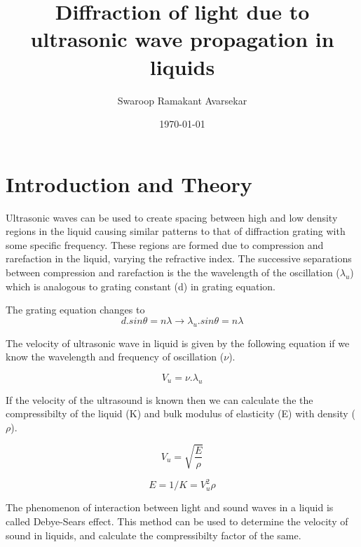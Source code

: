\documentclass[a4paper, amsfonts, amssymb, amsmath, reprint, showkeys, nofootinbib, twoside]{revtex4-1}
\begin{document}
\title{Diffraction of light due to ultrasonic wave propagation in liquids}
\author{Swaroop Ramakant Avarsekar}
\date{\today}
	
\maketitle

\section{Introduction and Theory}
Ultrasonic waves can be used to create spacing between high and low density regions in the liquid causing similar patterns to that of diffraction grating with some specific frequency. These regions are formed due to compression and rarefaction in the liquid, varying the refractive index. The successive separations between compression and rarefaction is the the wavelength of the oscillation ($\lambda_u$) which is analogous to  grating constant (d) in grating equation.
 
The grating equation changes to 
\begin{equation}
	d.sin\theta=n\lambda\rightarrow\lambda_u.sin\theta=n\lambda
\end{equation}

The velocity of ultrasonic wave in liquid is given by the following equation if we know the wavelength and frequency of oscillation ($\nu$).

\begin{equation}
	V_u=\nu.\lambda_u
\end{equation}

If the velocity of the ultrasound is known then we can calculate the the compressibilty of the liquid (K) and bulk modulus of elasticity (E) with density ($\rho$).

 \begin{equation}
 	V_u=\sqrt{\frac{E}{\rho}}
 \end{equation}
 
 \begin{equation}
 	E=1/K=V_u^2\rho
 \end{equation}
 
The phenomenon of interaction between light and sound waves in a liquid is called Debye-Sears effect.
This method can be used to determine the velocity of sound in liquids, and calculate the compressibilty factor of the same.
\end{document}
